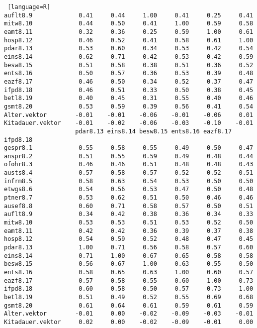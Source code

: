 \begin{lstlisting} [language=R]
auflt8.9             0.41     0.44     1.00     0.41     0.25     0.41
mitw8.10             0.44     0.50     0.41     1.00     0.59     0.58
eamt8.11             0.32     0.36     0.25     0.59     1.00     0.61
hosp8.12             0.46     0.52     0.41     0.58     0.61     1.00
pdar8.13             0.53     0.60     0.34     0.53     0.42     0.54
eins8.14             0.62     0.71     0.42     0.53     0.42     0.59
besw8.15             0.51     0.58     0.38     0.51     0.36     0.52
ents8.16             0.50     0.57     0.36     0.53     0.39     0.48
eazf8.17             0.46     0.50     0.34     0.52     0.37     0.47
ifpd8.18             0.46     0.51     0.33     0.50     0.38     0.45
betl8.19             0.40     0.45     0.31     0.55     0.40     0.46
gsmt8.20             0.53     0.59     0.39     0.56     0.41     0.54
Alter.vektor        -0.01    -0.01    -0.06    -0.01    -0.06     0.01
Kitadauer.vektor    -0.01    -0.02    -0.06    -0.03    -0.10    -0.01
                    pdar8.13 eins8.14 besw8.15 ents8.16 eazf8.17 ifpd8.18
gespr8.1             0.55     0.58     0.55     0.49     0.50     0.47
anspr8.2             0.51     0.55     0.59     0.49     0.48     0.44
ofohr8.3             0.46     0.46     0.51     0.48     0.48     0.43
austs8.4             0.57     0.58     0.57     0.52     0.52     0.51
infrm8.5             0.58     0.63     0.54     0.53     0.50     0.50
etwgs8.6             0.54     0.56     0.53     0.47     0.50     0.48
ptner8.7             0.53     0.62     0.51     0.50     0.46     0.46
ausef8.8             0.60     0.71     0.58     0.57     0.50     0.51
auflt8.9             0.34     0.42     0.38     0.36     0.34     0.33
mitw8.10             0.53     0.53     0.51     0.53     0.52     0.50
eamt8.11             0.42     0.42     0.36     0.39     0.37     0.38
hosp8.12             0.54     0.59     0.52     0.48     0.47     0.45
pdar8.13             1.00     0.71     0.56     0.58     0.57     0.60
eins8.14             0.71     1.00     0.67     0.65     0.58     0.58
besw8.15             0.56     0.67     1.00     0.63     0.55     0.50
ents8.16             0.58     0.65     0.63     1.00     0.60     0.57
eazf8.17             0.57     0.58     0.55     0.60     1.00     0.73
ifpd8.18             0.60     0.58     0.50     0.57     0.73     1.00
betl8.19             0.51     0.49     0.52     0.55     0.69     0.68
gsmt8.20             0.61     0.64     0.61     0.59     0.61     0.59
Alter.vektor        -0.01     0.00    -0.02    -0.09    -0.03    -0.01
Kitadauer.vektor     0.02     0.00    -0.02    -0.09    -0.01     0.00

\end{lstlisting}
